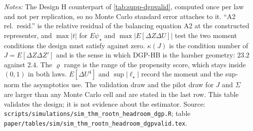 \documentclass[
  12pt]{article}
\newcommand{\1}[1]{\mathds{1}\left[#1\right]}
\theoremstyle{plain}
\theoremstyle{definition}
\theoremstyle{definition}
\theoremstyle{remark}
\begin{document}
\begin{table}[!htbp]
\centering
\begin{threeparttable}
\caption{The two headroom laws, and the conditions they were built to satisfy}
\label{tab:supp-h-dgpvalid}
\footnotesize

\begin{tablenotes}\footnotesize
\item \textit{Notes:} The Design H counterpart of \cref{tab:supp-dgpvalid},
computed once per law and not per replication, so no Monte Carlo standard error
attaches to it. ``A2 rel.\ resid.'' is the relative residual of the balancing
equation A2 at the constructed representer, and $\max|t|$ for $E\psi_\star$ and
$\max|E[\Delta Z\Delta U]|$ test the two moment conditions the design must
satisfy against zero. $\kappa(J)$ is the condition number of
$J=E[\Delta Z\Delta Z']$ and is the sense in which DGP-HB is the harsher
geometry: $23.2$ against $2.4$. The $\varrho$ range is the range of the
propensity score, which stays inside $(0,1)$ in both laws. $E[\Delta U^{4}]$ and
$\sup|\ell_\star|$ record the moment and the sup-norm the asymptotics use. The
validation draw and the pilot draw for $J$ and $\Sigma$ are larger than any
Monte Carlo cell and are stated in the last row. This table validates the design;
it is not evidence about the estimator. Source:
\texttt{scripts/simulations/sim\_thm\_rootn\_headroom\_dgp.R}; table
\texttt{paper/tables/sim/sim\_thm\_rootn\_headroom\_dgpvalid.tex}.
\end{tablenotes}
\end{threeparttable}
\end{table}
\end{document}
